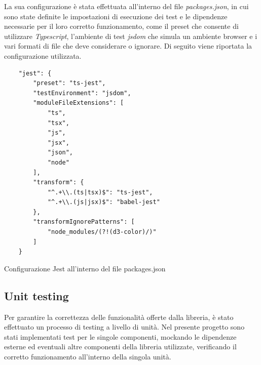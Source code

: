 La sua configurazione è stata effettuata all'interno del file \textit{packages.json}, in cui sono state definite le impostazioni di
esecuzione dei test e le dipendenze necessarie per il loro corretto funzionamento, come il preset che consente di utilizzare \textit{Typescript},
l'ambiente di test \textit{jsdom} che simula un ambiente browser e i vari formati di file che deve considerare o ignorare. \newline
Di seguito viene riportata la configurazione utilizzata.
\begin{listing}[H]
    \begin{verbatim}
    "jest": {
        "preset": "ts-jest",
        "testEnvironment": "jsdom",
        "moduleFileExtensions": [
            "ts",
            "tsx",
            "js",
            "jsx",
            "json",
            "node"
        ],
        "transform": {
            "^.+\\.(ts|tsx)$": "ts-jest",
            "^.+\\.(js|jsx)$": "babel-jest"
        },
        "transformIgnorePatterns": [
            "node_modules/(?!(d3-color)/)"
        ]
    }
    \end{verbatim}
    \caption{Configurazione Jest all'interno del file packages.json}
    \label{listing:jest_config}
\end{listing}

\subsection{Unit testing}
Per garantire la correttezza delle funzionalità offerte dalla libreria, è stato effettuato un processo di testing a livello di unità. \newline
Nel presente progetto sono stati implementati test per le singole componenti, mockando le dipendenze esterne ed eventuali altre componenti
della libreria utilizzate, verificando il corretto funzionamento all'interno della singola unità.

